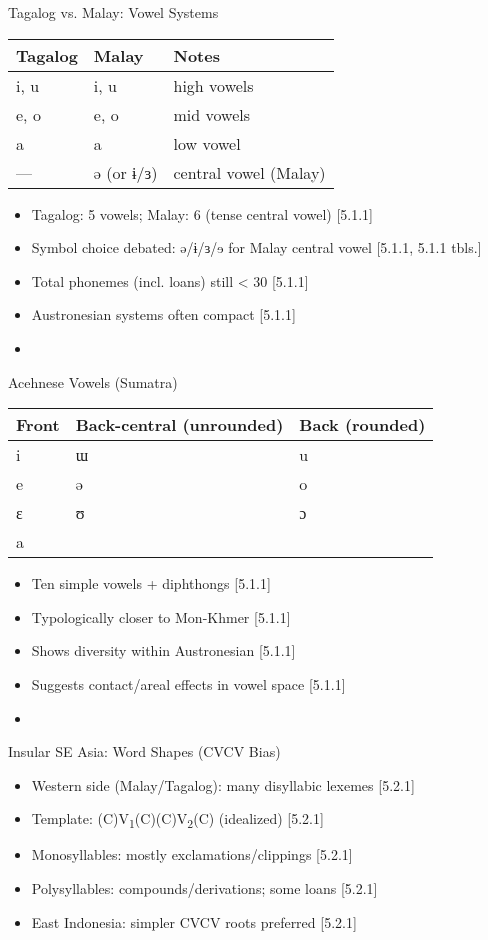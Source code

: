 \documentclass{beamer}
\newcommand{\booksrc}[1]{\hfill {\tiny [#1]}}
\begin{document}
\begin{frame}{Tagalog vs. Malay: Vowel Systems}
\begin{tabular}{lll}
Tagalog & Malay & Notes \\
\hline
i, u & i, u & high vowels \\
e, o & e, o & mid vowels \\
a & a & low vowel \\
--- & ə (or ɨ/ɜ) & central vowel (Malay) \\
\end{tabular}
\begin{itemize}
\item Tagalog: 5 vowels; Malay: 6 (tense central vowel) \booksrc{5.1.1}
\item Symbol choice debated: ə/ɨ/ɜ/ɘ for Malay central vowel \booksrc{5.1.1, 5.1.1 tbls.}
\item Total phonemes (incl. loans) still < 30 \booksrc{5.1.1}
\item Austronesian systems often compact \booksrc{5.1.1}
\item %
\end{itemize}
\end{frame}

\begin{frame}{Acehnese Vowels (Sumatra)}
\begin{tabular}{lll}
Front & Back-central (unrounded) & Back (rounded) \\
\hline
i & ɯ & u \\
e & ə & o \\
ɛ & ʊ & ɔ \\
a &  &  \\
\end{tabular}
\begin{itemize}
\item Ten simple vowels + diphthongs \booksrc{5.1.1}
\item Typologically closer to Mon-Khmer \booksrc{5.1.1}
\item Shows diversity within Austronesian \booksrc{5.1.1}
\item Suggests contact/areal effects in vowel space \booksrc{5.1.1}
\item %
\end{itemize}
\end{frame}

\begin{frame}{Insular SE Asia: Word Shapes (CVCV Bias)}
\begin{itemize}
\item Western side (Malay/Tagalog): many disyllabic lexemes \booksrc{5.2.1}
\item Template: (C)V\textsubscript{1}(C)(C)V\textsubscript{2}(C) (idealized) \booksrc{5.2.1}
\item Monosyllables: mostly exclamations/clippings \booksrc{5.2.1}
\item Polysyllables: compounds/derivations; some loans \booksrc{5.2.1}
\item East Indonesia: simpler CVCV roots preferred \booksrc{5.2.1}
\end{itemize}
\end{frame}
\end{document}
